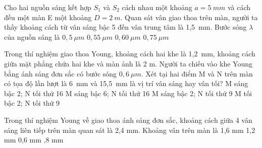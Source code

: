 \begin{vidu}%
Cho hai nguồn sáng kết hợp $S_1$ và $S_2$ cách nhau một khoảng $a=5\ mm$ và cách đều một màn E một khoảng $D=2\ m$. Quan sát vân giao thoa trên màn, người ta thấy khoảng cách từ vân sáng bậc 5 đến vân trung tâm là 1,5\ mm. Bước sóng $\lambda$ của nguồn sáng là
\choice
{$0,5\ \mu m$}
{$0,55\ \mu m$}
{$0,60 \ \mu m$}
{\True $0,75\ \mu m$}
\end{vidu} 
\begin{vidu}%
Trong thí nghiệm giao thoa Young, khoảng cách hai khe là 1,2\ mm, khoảng cách giữa mặt phẳng chứa hai khe và màn ảnh là 2 m. Người ta chiếu vào khe Young bằng ánh sáng đơn sắc có bước sóng $ 0,6\ \mu m $. Xét tại hai điểm M và N trên màn có tọa độ lần lượt là 6\ mm và 15,5\ mm là vị trí vân sáng hay vân tối?
\choice
{M sáng bậc 2; N tối thứ 16}
{\True M sáng bậc 6; N tối thứ 16}
{M sáng bậc 2; N tối thứ 9}
{M tối bậc 2; N tối thứ 9}
\end{vidu} 
\begin{vidu} %
 Trong thí nghiệm Young về giao thoa ánh sáng đơn sắc, khoảng cách giữa 4 vân sáng liên tiếp trên màn quan sát là 2,4 mm. Khoảng vân trên màn là
\choice
{1,6 mm}
{1,2 mm}
{0,6 mm}
{,8 mm}
\end{vidu} 
